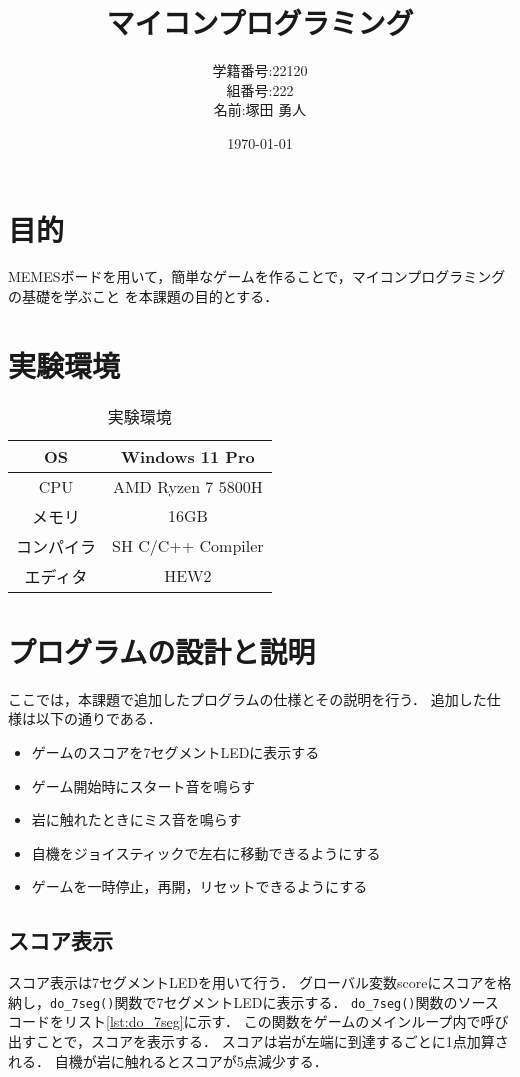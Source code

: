 \documentclass[a4paper,11pt,dvipdfmx]{jsarticle}
\begin{document}
\title{マイコンプログラミング}
\author{学籍番号:22120 \\ 組番号:222 \\名前:塚田 勇人}
\date{\today}
\maketitle

\newpage

\section{目的}
MEMESボードを用いて，簡単なゲームを作ることで，マイコンプログラミングの基礎を学ぶこと
を本課題の目的とする．

\section{実験環境}
\begin{table}
\centering
\caption{実験環境}
\label{table:environment}
\begin{tabular}{|c|c|}
\hline
OS    & Windows 11 Pro   \\
\hline
CPU   & AMD Ryzen 7 5800H \\
\hline
メモリ & 16GB              \\
\hline
コンパイラ & SH C/C++ Compiler \\
\hline
エディタ & HEW2  \\
\hline
\end{tabular}
\end{table}

\section{プログラムの設計と説明}
ここでは，本課題で追加したプログラムの仕様とその説明を行う．
追加した仕様は以下の通りである．
\begin{itemize}
  \item ゲームのスコアを7セグメントLEDに表示する
  \item ゲーム開始時にスタート音を鳴らす
  \item 岩に触れたときにミス音を鳴らす
  \item 自機をジョイスティックで左右に移動できるようにする
  \item ゲームを一時停止，再開，リセットできるようにする
\end{itemize}

\subsection{スコア表示}
スコア表示は7セグメントLEDを用いて行う．
グローバル変数scoreにスコアを格納し，\texttt{do\_7seg()}関数で7セグメントLEDに表示する．
\texttt{do\_7seg()}関数のソースコードをリスト\ref{lst:do_7seg}に示す．
この関数をゲームのメインループ内で呼び出すことで，スコアを表示する．
スコアは岩が左端に到達するごとに1点加算される．
自機が岩に触れるとスコアが5点減少する．
\end{document}
